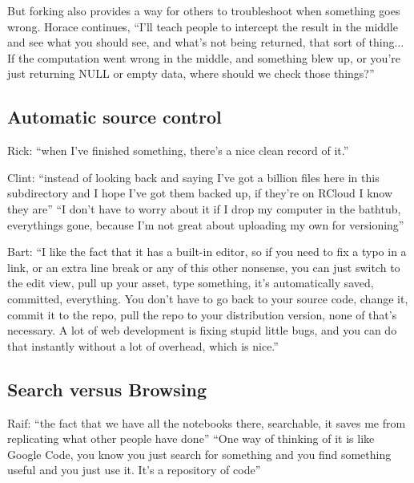 But forking also provides a way for others to troubleshoot when something goes wrong.
Horace continues, ``I'll teach people
to intercept the result in the middle and see what you should see, and what's
not being returned, that sort of thing... If the computation went wrong in the
middle, and something blew up, or you're just returning NULL or empty data,
where should we check those things?''




\subsection{Automatic source control}
Rick: ``when I've finished something, there's a nice clean record of it.''

Clint: ``instead of looking back and saying I've got a billion files here in
this subdirectory and I hope I've got them backed up, if they're on RCloud I
know they are'' ``I don't have to worry about it if I drop my computer in the
bathtub, everythings gone, because I'm not great about uploading my own for
versioning''

Bart: ``I like the fact that it has a built-in editor, so if you need to
fix a typo in a link, or an extra line break or any of this other nonsense,
you can just switch to the edit view, pull up your asset, type something, it's
automatically saved, committed, everything. You don't have to go back to your
source code, change it, commit it to the repo, pull the repo to your
distribution version, none of that's necessary. A lot of web development is
fixing stupid little bugs, and you can do that instantly without a lot
of overhead, which is nice.''


\subsection{Search versus Browsing}
Raif: ``the fact that we have all the notebooks there, searchable, it saves
me from replicating what other people have done'' ``One way of thinking of it is
like Google Code, you know you just search for something and you find something
useful and you just use it. It’s a repository of code''

